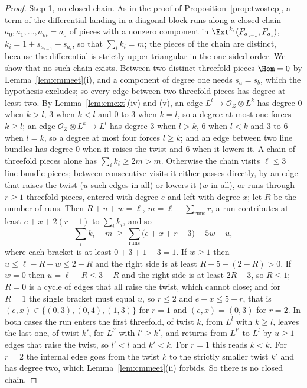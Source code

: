 \begin{proof}
Step 1, no closed chain. As in the proof of Proposition~\ref{prop:twostep}, a term of the differential landing in a diagonal block runs along a closed chain $a_{0},a_{1},\dots,a_{m}=a_{0}$ of pieces with a nonzero component in $\Ext^{k_{i}}(F_{a_{i-1}},F_{a_{i}})$, $k_{i}=1+s_{a_{i-1}}-s_{a_{i}}$, so that $\sum_{i}k_{i}=m$; the pieces of the chain are distinct, because the differential is strictly upper triangular in the one-sided order. We show that no such chain exists. Between two distinct threefold pieces $\Hom=0$ by Lemma~\ref{lem:cmmeet}(i), and a component of degree one needs $s_{a}=s_{b}$, which the hypothesis excludes; so every edge between two threefold pieces has degree at least two. By Lemma~\ref{lem:cmext}(iv) and (v), an edge $L^{l}\to\mathcal{O}_{Z}\otimes L^{k}$ has degree $0$ when $k>l$, $3$ when $k<l$ and $0$ to $3$ when $k=l$, so a degree at most one forces $k\ge l$; an edge $\mathcal{O}_{Z}\otimes L^{k}\to L^{l}$ has degree $3$ when $l>k$, $6$ when $l<k$ and $3$ to $6$ when $l=k$, so a degree at most four forces $l\ge k$; and an edge between two line bundles has degree $0$ when it raises the twist and $6$ when it lowers it. A chain of threefold pieces alone has $\sum_{i}k_{i}\ge2m>m$. Otherwise the chain visits $\ell\le3$ line-bundle pieces; between consecutive visits it either passes directly, by an edge that raises the twist ($u$ such edges in all) or lowers it ($w$ in all), or runs through $r\ge1$ threefold pieces, entered with degree $e$ and left with degree $x$; let $R$ be the number of runs. Then $R+u+w=\ell$, $m=\ell+\sum_{\mathrm{runs}}r$, a run contributes at least $e+x+2(r-1)$ to $\sum_{i}k_{i}$, and so
\[
\sum_{i}k_{i}-m\ \ge\ \sum_{\mathrm{runs}}\bigl(e+x+r-3\bigr)+5w-u ,
\]
where each bracket is at least $0+3+1-3=1$. If $w\ge1$ then $u\le\ell-R-w\le2-R$ and the right side is at least $R+5-(2-R)>0$. If $w=0$ then $u=\ell-R\le3-R$ and the right side is at least $2R-3$, so $R\le1$; $R=0$ is a cycle of edges that all raise the twist, which cannot close; and for $R=1$ the single bracket must equal $u$, so $r\le2$ and $e+x\le5-r$, that is $(e,x)\in\{(0,3),(0,4),(1,3)\}$ for $r=1$ and $(e,x)=(0,3)$ for $r=2$. In both cases the run enters the first threefold, of twist $k$, from $L^{l}$ with $k\ge l$, leaves the last one, of twist $k'$, for $L^{l'}$ with $l'\ge k'$, and returns from $L^{l'}$ to $L^{l}$ by $u\ge1$ edges that raise the twist, so $l'<l$ and $k'<k$. For $r=1$ this reads $k<k$. For $r=2$ the internal edge goes from the twist $k$ to the strictly smaller twist $k'$ and has degree two, which Lemma~\ref{lem:cmmeet}(ii) forbids. So there is no closed chain.


\end{proof}
